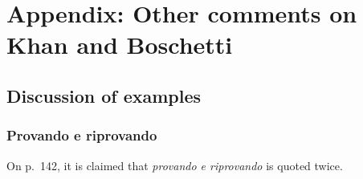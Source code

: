 \documentclass[10pt]{article}
\begin{document}
\par














\newpage
\section*{Appendix: Other comments on Khan and Boschetti }
\subsection*{Discussion of examples}



\subsubsection*{Provando e riprovando}



 On p.~142, it is claimed that \textit{provando e riprovando} is quoted twice. \par
\end{document}
